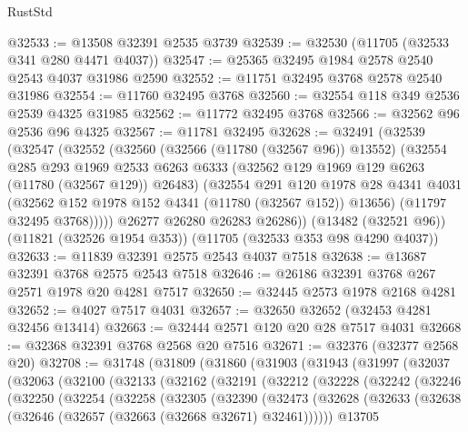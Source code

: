 \begin{lexlean}{RustStd}
\begin{coremodule}
@32533 := @13508 @32391 @2535 @3739
@32539 := @32530 (@11705 (@32533 @341 @280 @4471 @4037))
@32547 := @25365 @32495 @1984 @2578 @2540 @2543 @4037 @31986 @2590
@32552 := @11751 @32495 @3768 @2578 @2540 @31986
@32554 := @11760 @32495 @3768
@32560 := @32554 @118 @349 @2536 @2539 @4325 @31985
@32562 := @11772 @32495 @3768
@32566 := @32562 @96 @2536 @96 @4325
@32567 := @11781 @32495
@32628 := @32491
    (@32539
      (@32547
        (@32552
          (@32560
            (@32566 (@11780 (@32567 @96)) @13552)
            (@32554
              @285
              @293
              @1969
              @2533
              @6263
              @6333
              (@32562 @129 @1969 @129 @6263 (@11780 (@32567 @129)) @26483)
              (@32554
                @291
                @120
                @1978
                @28
                @4341
                @4031
                (@32562 @152 @1978 @152 @4341 (@11780 (@32567 @152)) @13656)
                (@11797 @32495 @3768)))))
        @26277
        @26280
        @26283
        @26286))
    (@13482 (@32521 @96))
    (@11821 (@32526 @1954 @353))
    (@11705 (@32533 @353 @98 @4290 @4037))
@32633 := @11839 @32391 @2575 @2543 @4037 @7518
@32638 := @13687 @32391 @3768 @2575 @2543 @7518
@32646 := @26186 @32391 @3768 @267 @2571 @1978 @20 @4281 @7517
@32650 := @32445 @2573 @1978 @2168 @4281
@32652 := @4027 @7517 @4031
@32657 := @32650 @32652 (@32453 @4281 @32456 @13414)
@32663 := @32444 @2571 @120 @20 @28 @7517 @4031
@32668 := @32368 @32391 @3768 @2568 @20 @7516
@32671 := @32376 (@32377 @2568 @20)
@32708 := @31748
    (@31809
      (@31860
        (@31903
          (@31943
            (@31997
              (@32037
                (@32063
                  (@32100
                    (@32133
                      (@32162
                        (@32191
                          (@32212
                            (@32228
                              (@32242
                                (@32246
                                  (@32250
                                    (@32254
                                      (@32258
                                        (@32305
                                          (@32390
                                            (@32473
                                              (@32628
                                                (@32633
                                                  (@32638
                                                    (@32646
                                                      (@32657 (@32663 (@32668 @32671) @32461))))))
                                              @13705

\end{coremodule}
\end{lexlean}
